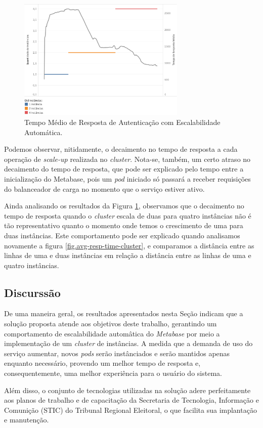 \begin{figure}[htp]
   \centering
    \includegraphics[width=8cm]{Imagens/Performance-HPA}
    \caption{Tempo Médio de Resposta de Autenticação com Escalabilidade Automática.}
    \label{fig.avg-resp-time-hpa}
\end{figure} 

Podemos observar, nitidamente, o decaimento no tempo de resposta a cada operação de \textit{scale-up} realizada no \textit{cluster}. Nota-se, também, um certo atraso no decaimento do tempo de resposta, que pode ser explicado pelo tempo entre a inicialização do Metabase, pois um \textit{pod} iniciado só passará a receber requisições do balanceador de carga no momento que o serviço estiver ativo.

Ainda analisando os resultados da Figura \ref{fig.avg-resp-time-hpa}, observamos que o decaimento no tempo de resposta quando o \textit{cluster} escala de duas para quatro instâncias não é tão representativo quanto o momento onde temos o crescimento de uma para duas instâncias. Este comportamento pode ser explicado quando analisamos novamente a figura \ref{fig.avg-resp-time-cluster}, e comparamos a distância entre as linhas de uma e duas instâncias em relação a distância entre as linhas de uma e quatro instâncias.


\subsection{Discurssão}

De uma maneira geral, os resultados apresentados nesta Seção indicam que a solução proposta atende aos objetivos deste trabalho, gerantindo um comportamento de escalabilidade automâtica do \textit{Metabase} por meio a implementação de um \textit{cluster} de instâncias. A medida que a demanda de uso do serviço aumentar, novos \textit{pods} serão instânciados e serão mantidos apenas enquanto necessário, provendo um melhor tempo de resposta e, consequentemente, uma melhor experiência para o usuário do sistema. 

Além disso, o conjunto de tecnologias utilizadas na solução adere perfeitamente aos planos de trabalho e de capacitação da Secretaria de Tecnologia, Informação e Comunição (STIC) do Tribunal Regional Eleitoral, o que facilita sua implantação e manutenção.

